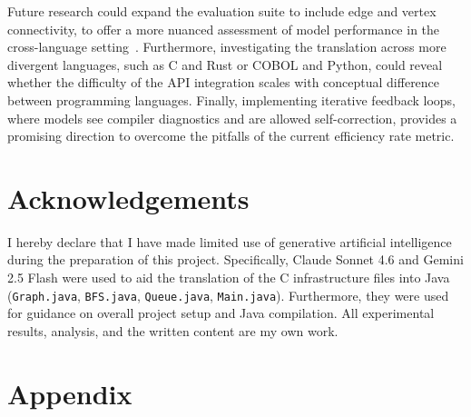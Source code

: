 Future research could expand the evaluation suite to include edge and vertex connectivity, to offer a more nuanced assessment of model performance in the cross-language setting~\cite{llmgen2025}. Furthermore, investigating the translation across more divergent languages, such as C and Rust or COBOL and Python, could reveal whether the difficulty of the API integration scales with conceptual difference between programming languages. Finally, implementing iterative feedback loops, where models see compiler diagnostics and are allowed self-correction, provides a promising direction to overcome the pitfalls of the current efficiency rate metric.


\newpage 

\section*{Acknowledgements}


I hereby declare that I have made limited use of generative artificial intelligence during the preparation of this project. Specifically, Claude Sonnet 4.6 and Gemini 2.5 Flash were used to aid the translation of the C infrastructure files into Java (\texttt{Graph.java}, \texttt{BFS.java}, \texttt{Queue.java}, \texttt{Main.java}). Furthermore, they were used for guidance on overall project setup and Java compilation. All experimental results, analysis, and the written content are my own work.


\newpage

\printbibliography

\newpage

\cleardoublepage
{}
\section*{Appendix}\label{sec:appendix} %

